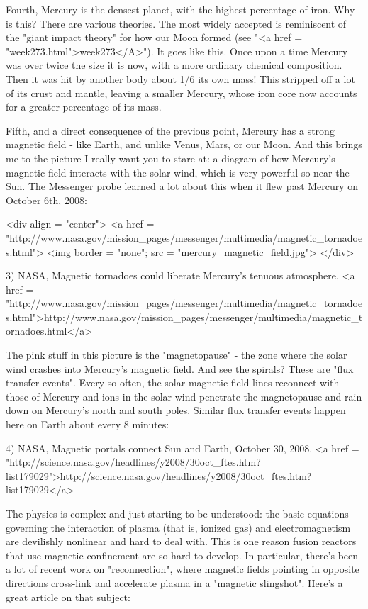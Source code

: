 Fourth, Mercury is the densest planet, with the highest percentage of
iron.  Why is this?  There are various theories.  The most widely
accepted is reminiscent of the "giant impact theory" for
how our Moon formed (see "<a href =
"week273.html">week273</A>").  It goes like this.  Once upon a
time Mercury was over twice the size it is now, with a more ordinary
chemical composition.  Then it was hit by another body about 1/6 its
own mass!  This stripped off a lot of its crust and mantle, leaving a
smaller Mercury, whose iron core now accounts for a greater percentage
of its mass.

Fifth, and a direct consequence of the previous point, Mercury has a
strong magnetic field - like Earth, and unlike Venus, Mars, or our
Moon.  And this brings me to the picture I really want you to stare
at: a diagram of how Mercury's magnetic field interacts with the solar
wind, which is very powerful so near the Sun.  The Messenger probe
learned a lot about this when it flew past Mercury on October 6th,
2008:

<div align = "center">
<a href = "http://www.nasa.gov/mission_pages/messenger/multimedia/magnetic_tornadoes.html">
<img border = "none"; src = "mercury_magnetic_field.jpg">
</div>

3) NASA, Magnetic tornadoes could liberate Mercury's tenuous atmosphere,
<a href = "http://www.nasa.gov/mission_pages/messenger/multimedia/magnetic_tornadoes.html">http://www.nasa.gov/mission_pages/messenger/multimedia/magnetic_tornadoes.html</a>

The pink stuff in this picture is the "magnetopause" - the
zone where the solar wind crashes into Mercury's magnetic field.  And
see the spirals?  These are "flux transfer events".  Every
so often, the solar magnetic field lines reconnect with those of
Mercury and ions in the solar wind penetrate the magnetopause and rain
down on Mercury's north and south poles.  Similar flux transfer events
happen here on Earth about every 8 minutes:

4) NASA, Magnetic portals connect Sun and Earth, October 30, 2008.
<a href = "http://science.nasa.gov/headlines/y2008/30oct_ftes.htm?list179029">http://science.nasa.gov/headlines/y2008/30oct_ftes.htm?list179029</a>

The physics is complex and just starting to be understood: the basic
equations governing the interaction of plasma (that is, ionized gas)
and electromagnetism are devilishly nonlinear and hard to deal with.
This is one reason fusion reactors that use magnetic confinement are
so hard to develop.  In particular, there's been a lot of recent work
on "reconnection", where magnetic fields pointing in
opposite directions cross-link and accelerate plasma in a
"magnetic slingshot".  Here's a great article on that
subject:

